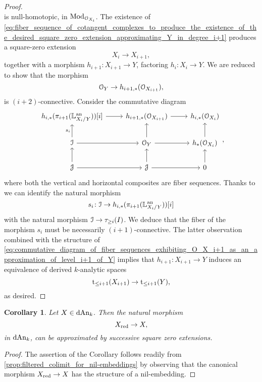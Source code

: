 \documentclass[10pt,a4paper,reqno]{amsart} %
\theoremstyle{plain}
\newtheorem{cor}[thm]{Corollary}
\theoremstyle{definition}
\theoremstyle{remark}
\numberwithin{equation}{section}
\begin{document}
\begin{proof}
\begin{equation}
        \end{equation}
    is null-homotopic, in $\mathrm{Mod}_{\mathcal O_{X_i}}$. The existence of
    \eqref{eq:fiber_sequence_of_cotangent_complexes_to_produce_the_existence_of_the_desired_square_zero_extension_approximating_Y_in_degree_i+1}
    produces a square-zero extension
        \[
            X_i  \to X_{i+1},
        \]
    together with a morphism $h_{i+1} \colon X_{i+1} \to Y$, factoring $h_i \colon X_i \to Y$. We  are reduced to show that the morphism
        \[
            \mathcal O_Y \to h_{i+1, *}(\mathcal O_{X_{i+1}}), 
        \]
    is $(i+2)$-connective. Consider the commutative diagram
        \begin{equation} \label{eq:commutative_diagram_of_fiber_sequences_exhibiting_O_X_i+1_as_an_approximation_of_level_i+1_of_Y}
        \begin{tikzcd}
            h_{i, *}(\pi_{i+1}(\bbL\an_{X_i/Y}))[i] \ar{r} & h_{i+1, *}(\cO_{X_{i+1}}) \ar{r} & h_{i, *}(\cO_{X_i}) \\
            \cI \ar{r} \ar{u}{s_i} & \cO_Y \ar{r} \ar{u} & h_*(\cO_{X_i}) \ar{u} \\
            \cJ \ar{r} \ar{u} & \cJ \ar{r} \ar{u} & 0 \ar{u}
        \end{tikzcd},
        \end{equation}
    where both the vertical and horizontal composites are fiber sequences. Thanks to \cite[Proposition 5.34]{Porta_Yu_Representability} we can identify the natural
    morphism    
        \[
           s_i \colon \mathcal I \to h_{i, *}(\pi_{i+1}(\mathbb L^\mathrm{an}_{X_i/Y}))[i]
        \]
    with the natural morphism $\mathcal I \to \tau_{\ge i}(I)$. We deduce that the fiber of the morphism $s_i$ must be necessarily $(i+1)$-connective. The latter observation
    combined with the structure of \eqref{eq:commutative_diagram_of_fiber_sequences_exhibiting_O_X_i+1_as_an_approximation_of_level_i+1_of_Y}
    implies that $h_{i+1} \colon X_{i+1} \to Y$ induces an equivalence of derived $k$-analytic spaces
        \[
            \mathrm t_{\le i+1}(X_{i+1}) \to \mathrm t_{\le i+1}(Y),  
        \]
    as desired.
\end{proof}

\begin{cor}
    Let $X \in \mathrm{dAn}_k$. Then the natural morphism
        \[
            X_{\mathrm{red}} \to X,  
        \]
    in $\mathrm{dAn}_k$, can be \emph{approximated} by successive square zero extensions.
\end{cor}

\begin{proof}
    The assertion of the Corollary follows readily from \cref{prop:filtered_colimit_for_nil-embeddings} by observing that the
    canonical morphism $X_{\mathrm{red}} \to X$ has the structure of a nil-embedding.
\end{proof}
\end{document}
